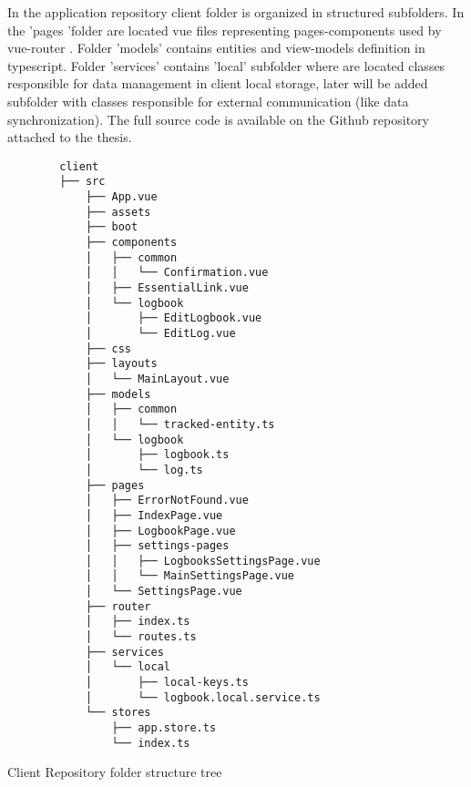 In the application repository client folder is organized in structured subfolders. In the 'pages 'folder are located vue files representing pages-components used by vue-router \autocite{VueRouter}. Folder 'models' contains entities and view-models definition in typescript. Folder 'services' contains 'local' subfolder where are located classes responsible for data management in client local storage, later will be added subfolder with classes responsible for external communication (like data synchronization). The full source code is available on the Github repository attached to the thesis.

\begin{listing}[H]
    \begin{verbatim}
        client
        ├── src
            ├── App.vue
            ├── assets
            ├── boot
            ├── components
            │   ├── common
            │   │   └── Confirmation.vue
            │   ├── EssentialLink.vue
            │   └── logbook
            │       ├── EditLogbook.vue
            │       └── EditLog.vue
            ├── css
            ├── layouts
            │   └── MainLayout.vue
            ├── models
            │   ├── common
            │   │   └── tracked-entity.ts
            │   └── logbook
            │       ├── logbook.ts
            │       └── log.ts
            ├── pages
            │   ├── ErrorNotFound.vue
            │   ├── IndexPage.vue
            │   ├── LogbookPage.vue
            │   ├── settings-pages
            │   │   ├── LogbooksSettingsPage.vue
            │   │   └── MainSettingsPage.vue
            │   └── SettingsPage.vue
            ├── router
            │   ├── index.ts
            │   └── routes.ts
            ├── services
            │   └── local
            │       ├── local-keys.ts
            │       └── logbook.local.service.ts
            └── stores
                ├── app.store.ts
                └── index.ts
    \end{verbatim}
\caption[]{Client Repository folder structure tree}
\end{listing}
